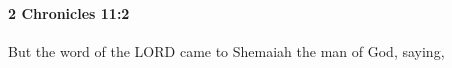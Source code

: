
		\paragraph{2 Chronicles 11:2} %
			\label{2CHRONICLES-11-2}

			But the word of the LORD came to Shemaiah the man of God, saying,


